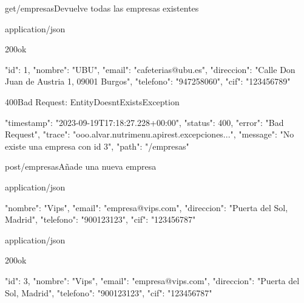 \begin{apiRoute}{get}{/empresas}{Devuelve todas las empresas existentes}
	
	\begin{routeParameter}
	\end{routeParameter}
	
	\begin{routeResponse}{application/json}
		\begin{routeResponseItem}{200}{ok}
			\begin{routeResponseItemBody}
{
	"id": 1,
	"nombre": "UBU",
	"email": "cafeterias@ubu.es",
	"direccion": "Calle Don Juan de Austria 1, 09001 Burgos",
	"telefono": "947258060",
	"cif": "123456789"
}
			\end{routeResponseItemBody}
		\end{routeResponseItem}
		\begin{routeResponseItem}{400}{Bad Request: EntityDoesntExistsException}
			\begin{routeResponseItemBody}
{
    "timestamp": "2023-09-19T17:18:27.228+00:00",
    "status": 400,
    "error": "Bad Request",
    "trace": "ooo.alvar.nutrimenu.apirest.excepciones...",
    "message": "No existe una empresa con id 3",
    "path": "/empresas"
}
			\end{routeResponseItemBody}
		\end{routeResponseItem}
	\end{routeResponse}
	
\end{apiRoute}

\begin{apiRoute}{post}{/empresas}{Añade una nueva empresa}
	\begin{routeParameter}
		\noRouteParameter{No hay parámetros}
	\end{routeParameter}
	\begin{routeRequest}{application/json}
		\begin{routeRequestBody}
{
	"nombre": "Vips",
	"email": "empresa@vips.com",
	"direccion": "Puerta del Sol, Madrid",
	"telefono": "900123123",
	"cif": "123456787"
}
		\end{routeRequestBody}
	\end{routeRequest}
	\begin{routeResponse}{application/json}
		\begin{routeResponseItem}{200}{ok}
			\begin{routeResponseItemBody}
{
	"id": 3,
	"nombre": "Vips",
	"email": "empresa@vips.com",
	"direccion": "Puerta del Sol, Madrid",
	"telefono": "900123123",
	"cif": "123456787"
}
			\end{routeResponseItemBody}
		\end{routeResponseItem}
	\end{routeResponse}
\end{apiRoute}

